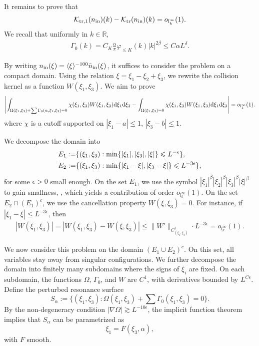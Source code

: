\documentclass[UTF-8,reqno]{amsart}
\numberwithin{equation}{section}
\theoremstyle{definition}
\def\dif{{\mathord{{\rm d}}}}
\def\min{{\mathord{{\rm min}}}}
\def\leq{\leqslant}
\def\dif{{\mathord{{\rm d}}}}
\def\min{{\mathord{{\rm min}}}}
\def\leq{\leqslant}
\begin{document}
It remains to prove that
\begin{align*}
   \mathcal K_{\rm tr,1}(n_{\mathrm{in}})(k)-\mathcal K_{\rm tr}(n_{\mathrm{in}})(k)
   =o_{l^\infty_k}(1).
\end{align*}
We recall that uniformly in $k\in\mathbb{R}$,
 \begin{align*}
     \Gamma_0(k)=C_K\frac{\alpha }{\pi }\varphi_{\leq K}(k)|k|^{2\beta}\leq C\alpha L^\delta.
 \end{align*} 

By writing $n_{\rm in }(\xi)=\langle \xi\rangle^{-100}\tilde{n}_{\rm in }(\xi)$, it suffices to consider the problem on a compact domain. 
Using the relation $\xi=\xi_1-\xi_2+\xi_3$, we rewrite the collision kernel as a function $W(\xi_1,\xi_3)$. We aim to prove
\begin{align*}
      \left|\int_{\Omega(\xi_1,\xi_3)+  \sum \Gamma_0(\alpha,\xi_1,\xi_3)=0}\chi (\xi_1,\xi_3)W (\xi_1,\xi_3)\dif \xi_1\dif \xi_3-\int_{\Omega(\xi_1,\xi_3)=0}\chi (\xi_1,\xi_3)W (\xi_1,\xi_3)\dif \xi_1\dif \xi_3\right| =o_{l^\infty_k}(1).
\end{align*}
where $\chi$ is a cutoff supported on $|\xi_1-a|\leq1$, $|\xi_3-b|\leq1$.

We decompose the domain into
\begin{align*}
  E_1:=  &\{(\xi_1,\xi_3):\min\{|\xi_1|,|\xi_3|,|\xi|\}\leq L^{-\epsilon}  \},\\
   E_2:=  &\{(\xi_1,\xi_3):\min\{|\xi_1-\xi|,|\xi_3-\xi|\}\leq L^{-3\epsilon}  \},
\end{align*}
for some $\epsilon>0$ small enough.  On the set $E_1$, we use the symbol $|\xi_1|^\beta|\xi_2|^\beta|\xi_3|^\beta|\xi|^\beta$ to gain smallness, , which yields a contribution of order $o_{l^\infty_k}(1)$.  On the set $E_2\cap (E_1)^c$, we use the cancellation property $W(\xi,\xi_3)=0$. For instance, if $|\xi_1-\xi|\leq L^{-3\epsilon}$, then
\begin{align*}
     |W (\xi_1,\xi_3)|=|W (\xi_1,\xi_3)-W (\xi,\xi_3)|\leq \|W'\|_{C^1_{(\xi_1,\xi_3)}}\cdot L^{-3\epsilon} =o_{l^\infty_k}(1).
\end{align*}

We now consider this problem on the domain $(E_1\cup E_2)^c$. On this set, all variables stay away from singular configurations. 
We further decompose the domain into finitely many subdomains where the signs of $\xi_i$ are fixed. 
On each subdomain, the functions $\Omega$, $\Gamma_0$, and $W$ are $C^1$, with derivatives bounded by $L^{C\epsilon}$. Define the perturbed resonance surface
 \[
S_\alpha := \{(\xi_1,\xi_3):\Omega(\xi_1,\xi_3)+\sum\Gamma_0(\xi_1,\xi_3)=0\}.
\]
By the non-degeneracy condition $|\nabla \Omega|\gtrsim L^{-10\epsilon}$, 
the implicit function theorem implies that $S_\alpha$ can be parametrized as
\[
\xi_1=F(\xi_3,\alpha),
\]
with $F$ smooth.
\end{document}
